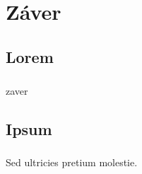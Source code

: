 \chapter{Záver}
\section{Lorem}
\paragraph{}
zaver


\section{Ipsum}
\paragraph{}
Sed ultricies pretium molestie.

